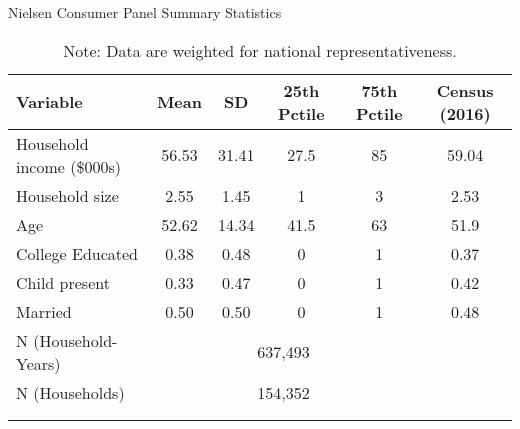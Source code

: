 \begin{table}[!htbp] \centering
\caption{Nielsen Consumer Panel Summary Statistics}
\label{tab:homescanSummaryStats}
\begin{tabular}{lcccc|c}
\\[-1.8ex]\hline
\hline
Variable                  & Mean  & SD    & 25th Pctile & 75th Pctile & Census (2016) \\
\hline
Household income (\$000s) & 56.53 & 31.41 & 27.5        & 85 & 59.04 \\
Household size            & 2.55  & 1.45  & 1           & 3  & 2.53 \\
Age                       & 52.62 & 14.34 & 41.5        & 63 & 51.9 \\
College Educated          & 0.38  & 0.48  & 0           & 1  & 0.37 \\
Child present             & 0.33  & 0.47  & 0           & 1  & 0.42 \\
Married                   & 0.50  & 0.50  & 0           & 1  & 0.48 \\
\hline
N (Household-Years)       & \multicolumn{4}{c}{637,493} \\
N (Households)            & \multicolumn{4}{c}{154,352} \\
\\[-1.8ex]\hline
\hline \\[-1.8ex]
\end{tabular}
\caption*{Note: Data are weighted for national representativeness.}
\end{table}
